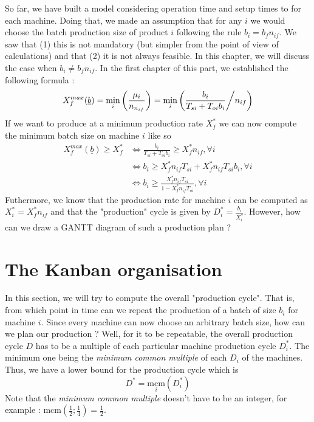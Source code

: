 So far, we have built a model considering operation time and setup times to for each machine. Doing that, we made an assumption that for any $i$ we would choose the batch production size of product $i$ following the rule $b_i = b_fn_{if}$. We saw that (1) this is not mandatory (but simpler from the point of view of calculations) and that (2) it is not always feasible. In this chapter, we will discuss the case when $b_i \ne b_fn_{if}$. In the first chapter of this part, we established the following formula : 
\[ X_f^{max}(\underline b) = \min_i\left( \frac{\mu_i}{n_{n_{if}}}\right) = \min_i\left( \frac{b_i}{T_{si} + T_{oi}b_i} \middle/ n_{if} \right) \] If we want to produce at a minimum production rate $X_f^*$ we can now compute the minimum batch size on machine $i$ like so \[
    \begin{split}
        X_f^{max}(\underline b) \ge X_f^*
            &\Leftrightarrow \frac{b_i}{T_{si}+T_{oi}b_i}\ge X_f^*n_{if},\forall i\\
            &\Leftrightarrow b_i\ge X_f^*n_{if}T_{si} + X_f^*n_{if}T_{oi}b_i,\forall i\\
            &\Leftrightarrow b_i\ge \frac{X_f^*n_{if}T_{si}}{1 - X_f^*n_{if}T_{oi}}, \forall i
    \end{split}
\]
Futhermore, we know that the production rate for machine $i$ can be computed as $X_i^*=X_f^*n_{if}$ and that the "production" cycle is given by $D_i^*=\frac{b_i}{X_i^*}$. However, how can we draw a GANTT diagram of such a production plan ?

\section{The Kanban organisation}

In this section, we will try to compute the overall "production cycle". That is, from which point in time can we repeat the production of a batch of size $b_i$ for machine $i$. Since every machine can now choose an arbitrary batch size, how can we plan our production ? Well, for it to be repeatable, the overall production cycle $D$ has to be a multiple of each particular machine production cycle $D_i^*$. The minimum one being the \emph{minimum common multiple} of each $D_i$ of the machines. Thus, we have a lower bound for the production cycle which is \[ D^* = \underset{i}{\textrm{mcm}}(D_i^*) \]Note that the \emph{minimum common multiple} doesn't have to be an integer, for example : $\textrm{mcm}\left( \frac{1}{2} ; \frac{1}{4} \right) = \frac{1}{2}$. 


